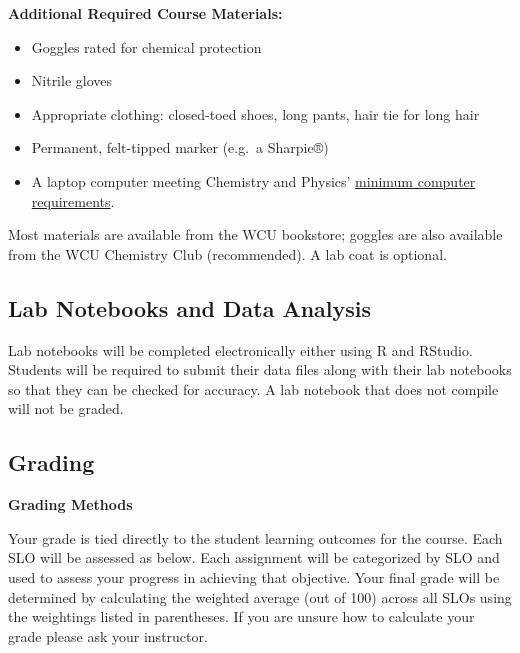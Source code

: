 \documentclass[]{tufte-book}
\providecommand{\tightlist}{%
  \setlength{\itemsep}{0pt}\setlength{\parskip}{0pt}}
\begin{document}
\textbf{Additional Required Course Materials:}

\begin{itemize}
\tightlist
\item
  Goggles rated for chemical protection
\item
  Nitrile gloves
\item
  Appropriate clothing: closed-toed shoes, long pants, hair tie for long hair
\item
  Permanent, felt-tipped marker (e.g.~a Sharpie®)
\item
  A laptop computer meeting Chemistry and Physics' \href{https://www.wcu.edu/learn/academic-services/it/computer-guidelines/index.aspx}{minimum computer requirements}.
\end{itemize}

Most materials are available from the WCU bookstore; goggles are also available from the WCU Chemistry Club (recommended). A lab coat is optional.

\hypertarget{lab-notebooks-and-data-analysis}{%
\subsection*{Lab Notebooks and Data Analysis}\label{lab-notebooks-and-data-analysis}}

Lab notebooks will be completed electronically either using R and RStudio. Students will be required to submit their data files along with their lab notebooks so that they can be checked for accuracy. A lab notebook that does not compile will not be graded.

\hypertarget{grading}{%
\subsection*{Grading}\label{grading}}

\textbf{Grading Methods}

Your grade is tied directly to the student learning outcomes for the course. Each SLO will be assessed as below. Each assignment will be categorized by SLO and used to assess your progress in achieving that objective. Your final grade will be determined by calculating the weighted average (out of 100) across all SLOs using the weightings listed in parentheses. If you are unsure how to calculate your grade please ask your instructor.
\end{document}

